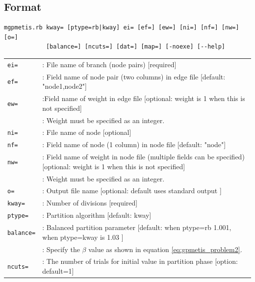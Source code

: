 \begin{figure}[htbp]
\begin{center}
\begin{tabular}{cc}
\end{tabular} 
\end{center}
\end{figure} 


\subsection{Format}
\begin{verbatim}
mgpmetis.rb kway= [ptype=rb|kway] ei= [ef=] [ew=] [ni=] [nf=] [nw=] [o=]
            [balance=] [ncuts=] [dat=] [map=] [-noexe] [--help]
\end{verbatim}

\begin{table}[htbp]
{\small
\begin{tabular}{ll}
\verb|ei=|    & : File name of branch (node pairs) [required]  \\
\verb|ef=|    & : Field name of node pair (two columns) in edge file [default: "node1,node2"]   \\
\verb|ew=|    & :Field name of weight in edge file [optional: weight is 1 when this is not specified]  \\
              & : Weight must be specified as an integer.   \\
\verb|ni=|    & : File name of node [optional]  \\
\verb|nf=|    & : Field name of node (1 column) in node file [default: "node"]  \\
\verb|nw=|    & : Field name of weight in node file (multiple fields can be specified) [optional:  weight is 1 when this is not specified]  \\
              & : Weight must be specified as an integer.  \\
\verb|o=|     & : Output file name [optional: default uses standard output ]  \\
\verb|kway=|  & : Number of divisions [required]  \\
\verb|ptype=| & : Partition algorithm [default: kway]   \\
\verb|balance=| & : Balanced partition parameter [default: when ptype=rb 1.001, when ptype=kway is 1.03 ]  \\
              & : Specify the $\beta$ value as shown in equation \ref{eq:gpmetis_problem2}. \\
\verb|ncuts=| & : The number of trials for initial value in partition phase [option: default=1] \\


\end{tabular}}
\end{table}
